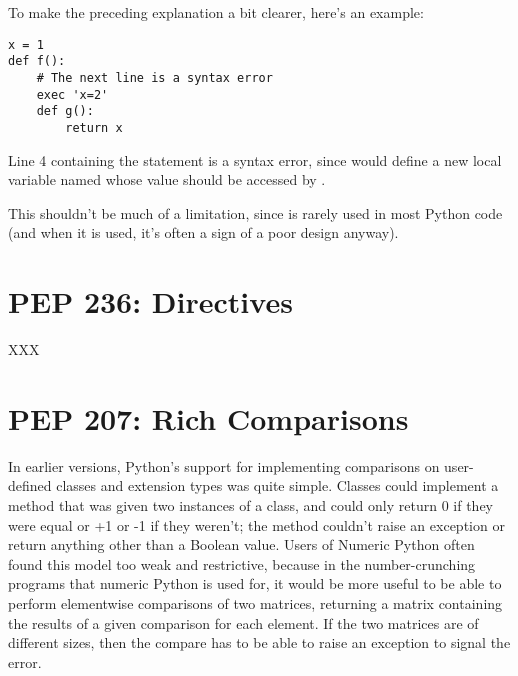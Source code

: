 \documentclass{howto}
\begin{document}
To make the preceding explanation a bit clearer, here's an example:

\begin{verbatim}
x = 1
def f():
    # The next line is a syntax error
    exec 'x=2'  
    def g():
        return x
\end{verbatim}

Line 4 containing the  statement is a syntax error,
since  would define a new local variable named 
whose value should be accessed by .  

This shouldn't be much of a limitation, since  is rarely
used in most Python code (and when it is used, it's often a sign of a
poor design anyway).

\begin{seealso}


\end{seealso}


\section{PEP 236:  Directives}

XXX

\section{PEP 207: Rich Comparisons}

In earlier versions, Python's support for implementing comparisons on
user-defined classes and extension types was quite simple. Classes
could implement a  method that was given two instances
of a class, and could only return 0 if they were equal or +1 or -1 if
they weren't; the method couldn't raise an exception or return
anything other than a Boolean value.  Users of Numeric Python often
found this model too weak and restrictive, because in the
number-crunching programs that numeric Python is used for, it would be
more useful to be able to perform elementwise comparisons of two
matrices, returning a matrix containing the results of a given
comparison for each element.  If the two matrices are of different
sizes, then the compare has to be able to raise an exception to signal
the error.
\end{document}
